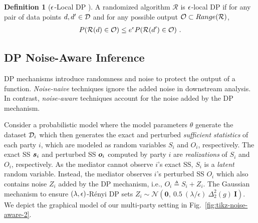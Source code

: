 \documentclass{article}
\theoremstyle{plain}
\theoremstyle{definition}
\newtheorem{definition}[theorem]{Definition}
\theoremstyle{remark}
\begin{document}
\begin{definition}[${\epsilon}$-Local DP \cite{yang2020localdp}]\label{def:localdp}
A randomized algorithm $\mathcal{R}$ is ${\epsilon}$-local DP if for any pair of data points $d, d' \in {\mathcal{D}}$ and for any possible output ${\mathcal{O}} \subset \mathop{Range}(\mathcal{R})$,
\begin{eqnarray*}
P(\mathcal{R}(d) \in {\mathcal{O}}) \leq e^\epsilon P(\mathcal{R}(d') \in {\mathcal{O}}) \ . 
\end{eqnarray*}
\end{definition}

\subsection{DP Noise-Aware Inference}\label{app:sub:inference}

DP mechanisms introduce randomness and noise to protect the output of a function.
\emph{Noise-naive} techniques ignore the added noise in downstream analysis. In contrast, \emph{noise-aware} techniques account for the noise added by the DP mechanism.

Consider a probabilistic model where the model parameters $\theta$ generate the dataset ${\mathcal{D}}_i$ which then generates the exact and perturbed \emph{sufficient statistics} of each party $i$, which are modeled as random variables $S_i$ and $O_i$, respectively. The exact SS ${\bm{s}}_i$ and perturbed SS ${\bm{o}}_i$ computed by party $i$ are \emph{realizations} of $S_i$ and $O_i$, respectively.
As the mediator cannot observe $i$'s exact SS, $S_i$ is a \emph{latent} random variable.
Instead, the mediator observes $i$'s perturbed SS $O_i$ which also contains noise $Z_i$ added by the DP mechanism, i.e., $O_i \triangleq S_i + Z_i$. The Gaussian mechanism to ensure $(\lambda,{\epsilon})$-R{\'e}nyi DP sets $Z_i \sim \mathcal{N}\left(\mathbf{0},\ 0.5\ ({\lambda}/\epsilon)\  \Delta_2^2(g)\ \boldsymbol{I} \right)$. We depict the graphical model of our multi-party setting in Fig.~\ref{fig:tikz-noise-aware-2}.
\end{document}
